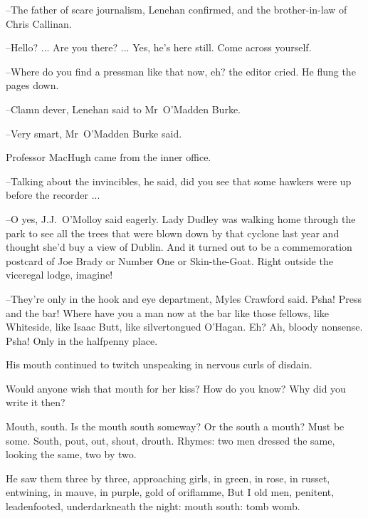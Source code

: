 --The father of scare journalism,
Lenehan confirmed,
and the brother-in-law of Chris Callinan.

--Hello? ...
Are you there? ...
Yes, he's here still.
Come across yourself.

--Where do you find a pressman like that now, eh?
the editor cried.
He flung the pages down.

--Clamn dever,
Lenehan said to Mr~O'Madden Burke.

--Very smart,
Mr~O'Madden Burke said.

Professor MacHugh came from the inner office.

--Talking about the invincibles,
he said,
did you see that some hawkers were up before the recorder ...

--O yes,
J.J.~O'Molloy said eagerly.
Lady Dudley was walking home through the park
to see all the trees that were blown down by that cyclone last year
and thought she'd buy a view of Dublin.
And it turned out to be a commemoration postcard
of Joe Brady or Number One or Skin-the-Goat.
Right outside the viceregal lodge,
imagine!

--They're only in the hook and eye department,
Myles Crawford said.
Psha!
Press and the bar!
Where have you a man now at the bar like those fellows,
like Whiteside,
like Isaac Butt,
like silvertongued O'Hagan.
Eh?
Ah, bloody nonsense.
Psha!
Only in the halfpenny place.

His mouth continued to twitch unspeaking
in nervous curls of disdain.

Would anyone wish that mouth for her kiss?
How do you know?
Why did you write it then?



Mouth, south.
Is the mouth south someway?
Or the south a mouth?
Must be some.
South,
pout,
out,
shout,
drouth.
Rhymes:
two men dressed the same,
looking the same,
two by two.



He saw them three by three,
approaching girls,
in green,
in rose,
in russet,
entwining,
in mauve,
in purple,
gold of oriflamme,
But I old men,
penitent,
leadenfooted,
underdarkneath the night:
mouth south:
tomb womb.

